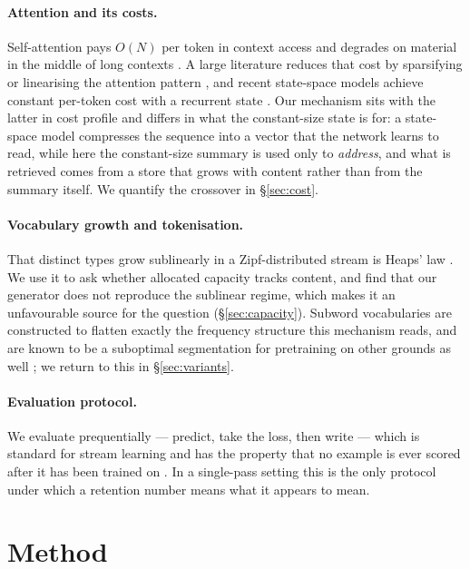 \documentclass[11pt,a4paper]{article}
\begin{document}
\paragraph{Attention and its costs.}
Self-attention \citep{vaswani2017attention} pays $O(N)$ per token in context
access and degrades on material in the middle of long contexts
\citep{liu2024lost}. A large literature reduces that cost by sparsifying or
linearising the attention pattern
\citep{beltagy2020longformer,katharopoulos2020transformers,tay2022efficient},
and recent state-space models achieve constant per-token cost with a
recurrent state \citep{gu2023mamba}. Our mechanism sits with the latter in
cost profile and differs in what the constant-size state is for: a state-space
model compresses the sequence into a vector that the network learns to read,
while here the constant-size summary is used only to \emph{address}, and what
is retrieved comes from a store that grows with content rather than from the
summary itself. We quantify the crossover in \S\ref{sec:cost}.

\paragraph{Vocabulary growth and tokenisation.}
That distinct types grow sublinearly in a Zipf-distributed stream
\citep{zipf1949human,piantadosi2014zipf} is Heaps' law
\citep{heaps1978information}. We use it to ask whether allocated capacity
tracks content, and find that our generator does not reproduce the sublinear
regime, which makes it an unfavourable source for the question
(\S\ref{sec:capacity}). Subword vocabularies
\citep{sennrich2016neural} are constructed to flatten exactly the frequency
structure this mechanism reads, and are known to be a suboptimal segmentation
for pretraining on other grounds as well \citep{bostrom2020byte}; we return to
this in \S\ref{sec:variants}.

\paragraph{Evaluation protocol.}
We evaluate prequentially --- predict, take the loss, then write
\citep{dawid1984present} --- which is standard for stream learning
\citep{gama2013evaluating} and has the property that no example is ever scored
after it has been trained on \citep{blier2018description}. In a single-pass
setting this is the only protocol under which a retention number means what it
appears to mean.

\section{Method}
\label{sec:method}
\end{document}
